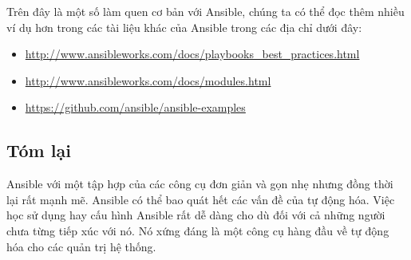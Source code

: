 Trên đây là một số làm quen cơ bản với Ansible, chúng ta có thể đọc thêm nhiều ví dụ hơn trong các tài liệu khác của Ansible trong các địa chỉ dưới đây:

\begin{itemize}
\item \url{http://www.ansibleworks.com/docs/playbooks_best_practices.html}
\item \url{http://www.ansibleworks.com/docs/modules.html}
\item \url{https://github.com/ansible/ansible-examples}
\end{itemize}


\subsection*{Tóm lại}

Ansible với một tập hợp của các công cụ đơn giản và gọn nhẹ nhưng đồng thời lại rất mạnh mẽ. Ansible có thể bao quát hết các vấn đề của tự động hóa. Việc học sử dụng hay cấu hình Ansible rất dễ dàng cho dù đối với cả những người chưa từng tiếp xúc với nó. Nó xứng đáng là một công cụ hàng đầu về tự động hóa cho các quản trị hệ thống.
